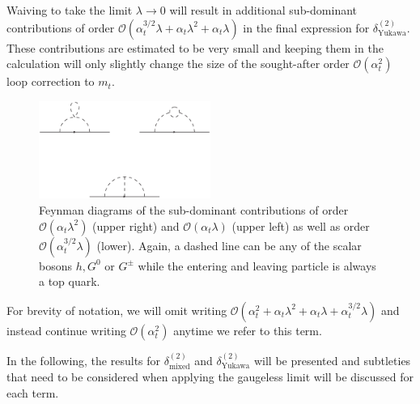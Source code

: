 \documentclass[a4paper,12pt]{book}
\begin{document}
Waiving to take the limit $\lambda \rightarrow 0$ will result in additional sub-dominant contributions of order $\mathcal{O}(\alpha^{3/2}_t \lambda+ \alpha_t \lambda^2+\alpha_t \lambda)$ in the final expression for $\delta^{(2)}_\text{Yukawa}$. These contributions are estimated to be very small and keeping them in the calculation will only slightly change the size of the sought-after order $\mathcal{O}(\alpha_t^2)$ loop correction to $m_t$.
\begin{figure}[h]
\begin{center}
\includegraphics[width=0.5\textwidth]{src/feynman/diagramsath.eps}
\caption{Feynman diagrams of the sub-dominant contributions of order $\mathcal{O}(\alpha_t \lambda^2)$ (upper right) and $\mathcal{O}(\alpha_t \lambda)$ (upper left) as well as order $\mathcal{O}(\alpha^{3/2}_t \lambda)$ (lower). Again, a dashed line can be any of the scalar bosons $h, G^0$ or $G^\pm$ while the entering and leaving particle is always a top quark.}
\label{fig::diagramsath}
\end{center}
\end{figure}
For brevity of notation, we will omit writing $\mathcal{O}(\alpha_t^2+\alpha_t\lambda^2+\alpha_t \lambda+\alpha_t^{3/2}\lambda)$ and instead continue writing $\mathcal{O}(\alpha_t^2)$ anytime we refer to this term.\par 
In the following, the results for $\delta^{(2)}_\text{mixed}$ and $\delta^{(2)}_\text{Yukawa}$ will be presented and subtleties that need to be considered when applying the gaugeless limit will be discussed for each term. 
\end{document}
